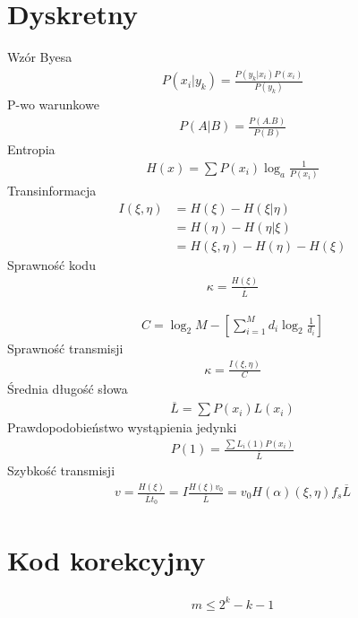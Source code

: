 \documentclass[10pt,i,twocolumn,a4paper]{article}
\begin{document}
\author{Jakub Król}
\date{Semestr zimowy 2011}
\section{Dyskretny} 
Wzór Byesa
\begin{align*}
	P(x_i|y_k) = \frac{P(y_k|x_i) P(x_i)}{P(y_k)}
\end{align*}
P-wo warunkowe
\begin{align*}
	P(A|B) = \frac{P(A.B)}{P(B)}
\end{align*}
Entropia
\begin{align*}
	H(x) = \sum P(x_i) \log_a{\frac{1}{P(x_i)}}
\end{align*}
Transinformacja
\begin{align*}
	I(\xi,\eta) & = H(\xi)-H(\xi|\eta) \\
				& =H(\eta)-H(\eta|\xi)\\
				& = H(\xi,\eta)-H(\eta)-H(\xi)
\end{align*}
Sprawność kodu
\begin{align*}
	\kappa = \frac{H(\xi)}{\overline{L}}
\end{align*}

\begin{align*}
	C = \log_2{M} - \left[\sum_{i=1}^M d_i\log_2{\frac{1}{d_i}} \right]
\end{align*}
Sprawność transmisji
\begin{align*}
	\kappa = \frac{I(\xi,\eta)}{C}
\end{align*}
Średnia długość słowa
\begin{align*}
	\overline{L} = \sum P(x_i)L(x_i)
\end{align*}
Prawdopodobieństwo wystąpienia jedynki
\begin{align*}
	P(1) = \frac{\sum L_i(1)P(x_i)}{\overline{L}}
\end{align*}
Szybkość transmisji
\begin{align*}
	v = \frac{H(\xi)}{\overline{L}t_0} = I\frac{H(\xi)v_0}{\overline{L}} = v_0H(\alpha) (\xi,\eta)f_s \overline{L}
\end{align*}

\section{Kod korekcyjny}
\begin{align*}
	m \le 2^k-k-1
\end{align*}
\end{document}
